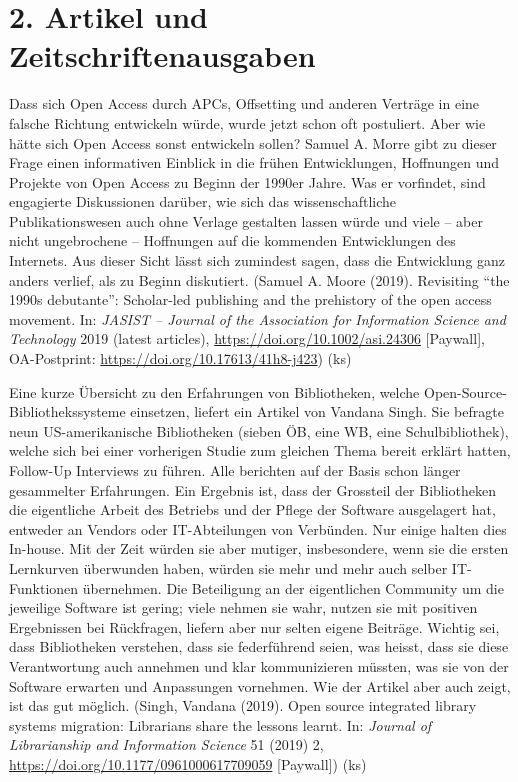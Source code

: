 \documentclass[a4paper,
fontsize=11pt,
oneside,
numbers=noperiodatend,
parskip=half-,
bibliography=totoc,
final
]{scrartcl}
\begin{document}
\hypertarget{artikel-und-zeitschriftenausgaben}{%
\section{2. Artikel und
Zeitschriftenausgaben}\label{artikel-und-zeitschriftenausgaben}}

Dass sich Open Access durch APCs, Offsetting und anderen Verträge in
eine falsche Richtung entwickeln würde, wurde jetzt schon oft
postuliert. Aber wie hätte sich Open Access sonst entwickeln sollen?
Samuel A. Morre gibt zu dieser Frage einen informativen Einblick in die
frühen Entwicklungen, Hoffnungen und Projekte von Open Access zu Beginn
der 1990er Jahre. Was er vorfindet, sind engagierte Diskussionen
darüber, wie sich das wissenschaftliche Publikationswesen auch ohne
Verlage gestalten lassen würde und viele -- aber nicht ungebrochene --
Hoffnungen auf die kommenden Entwicklungen des Internets. Aus dieser
Sicht lässt sich zumindest sagen, dass die Entwicklung ganz anders
verlief, als zu Beginn diskutiert. (Samuel A. Moore (2019). Revisiting
\enquote{the 1990s debutante}: Scholar-led publishing and the prehistory
of the open access movement. In: \emph{JASIST -- Journal of the
Association for Information Science and Technology} 2019 (latest
articles), \url{https://doi.org/10.1002/asi.24306} {[}Paywall{]},
OA-Postprint: \url{https://doi.org/10.17613/41h8-j423}) (ks)

Eine kurze Übersicht zu den Erfahrungen von Bibliotheken, welche
Open-Source-Bibliotheks\-systeme einsetzen, liefert ein Artikel von
Vandana Singh. Sie befragte neun US-amerikanische Bibliotheken (sieben
ÖB, eine WB, eine Schulbibliothek), welche sich bei einer vorherigen
Studie zum gleichen Thema bereit erklärt hatten, Follow-Up Interviews zu
führen. Alle berichten auf der Basis schon länger gesammelter
Erfahrungen. Ein Ergebnis ist, dass der Grossteil der Bibliotheken die
eigentliche Arbeit des Betriebs und der Pflege der Software ausgelagert
hat, entweder an Vendors oder IT-Abteilungen von Verbünden. Nur einige
halten dies In-house. Mit der Zeit würden sie aber mutiger,
insbesondere, wenn sie die ersten Lernkurven überwunden haben, würden
sie mehr und mehr auch selber IT-Funktionen übernehmen. Die Beteiligung
an der eigentlichen Community um die jeweilige Software ist gering;
viele nehmen sie wahr, nutzen sie mit positiven Ergebnissen bei
Rückfragen, liefern aber nur selten eigene Beiträge. Wichtig sei, dass
Bibliotheken verstehen, dass sie federführend seien, was heisst, dass
sie diese Verantwortung auch annehmen und klar kommunizieren müssten,
was sie von der Software erwarten und Anpassungen vornehmen. Wie der
Artikel aber auch zeigt, ist das gut möglich. (Singh, Vandana (2019).
Open source integrated library systems migration: Librarians share the
lessons learnt. In: \emph{Journal of Librarianship and Information
Science} 51 (2019) 2, \url{https://doi.org/10.1177/0961000617709059}
{[}Paywall{]}) (ks)
\end{document}
